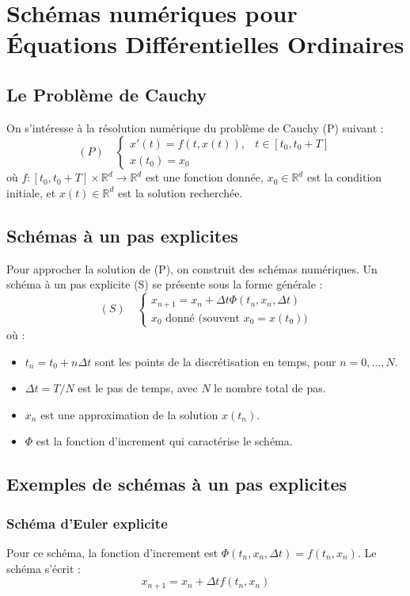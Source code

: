 
\sloppy

\section{Schémas numériques pour Équations Différentielles Ordinaires}

\subsection{Le Problème de Cauchy}
On s'intéresse à la résolution numérique du problème de Cauchy (P) suivant :
\[
(P) \quad
\begin{cases}
x'(t) = f(t, x(t)), & t \in [t_0, t_0+T] \\
x(t_0) = x_0
\end{cases}
\]
où $f: [t_0, t_0+T] \times \mathbb{R}^d \to \mathbb{R}^d$ est une fonction donnée, $x_0 \in \mathbb{R}^d$ est la condition initiale, et $x(t) \in \mathbb{R}^d$ est la solution recherchée.

\subsection{Schémas à un pas explicites}
Pour approcher la solution de (P), on construit des schémas numériques. Un schéma à un pas explicite (S) se présente sous la forme générale :
\[
(S) \quad
\begin{cases}
x_{n+1} = x_n + \Delta t \Phi(t_n, x_n, \Delta t) \\
x_0 \text{ donné (souvent } x_0 = x(t_0))
\end{cases}
\]
où :
\begin{itemize}
    \item $t_n = t_0 + n \Delta t$ sont les points de la discrétisation en temps, pour $n=0, \dots, N$.
    \item $\Delta t = T/N$ est le pas de temps, avec $N$ le nombre total de pas.
    \item $x_n$ est une approximation de la solution $x(t_n)$.
    \item $\Phi$ est la fonction d'increment qui caractérise le schéma.
\end{itemize}

\subsection{Exemples de schémas à un pas explicites}

\subsubsection{Schéma d'Euler explicite}
Pour ce schéma, la fonction d'increment est $\Phi(t_n, x_n, \Delta t) = f(t_n, x_n)$. Le schéma s'écrit :
\[
x_{n+1} = x_n + \Delta t f(t_n, x_n)
\]

